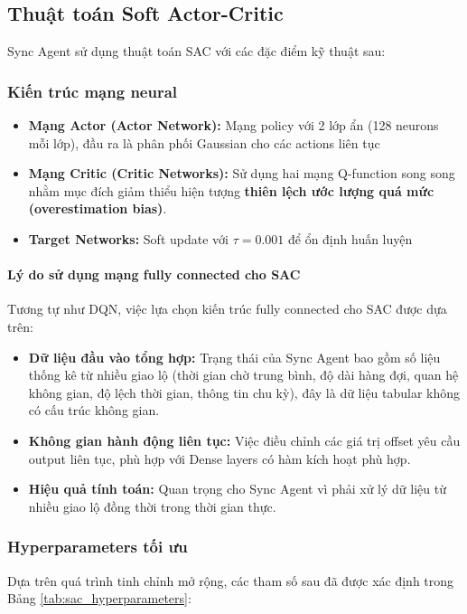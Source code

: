 \subsection{Thuật toán Soft Actor-Critic}
Sync Agent sử dụng thuật toán SAC với các đặc điểm kỹ thuật sau:

\subsubsection{Kiến trúc mạng neural}
\begin{itemize}
    \item \textbf{Mạng Actor (Actor Network):} Mạng policy với 2 lớp ẩn (128 neurons mỗi lớp),
        đầu ra là phân phối Gaussian cho các actions liên tục

    \item \textbf{Mạng Critic (Critic Networks):} Sử dụng hai mạng Q-function song song nhằm mục đích giảm thiểu hiện tượng \textbf{thiên lệch ước lượng quá mức (overestimation bias)}.

    \item \textbf{Target Networks:} Soft update với $\tau = 0.001$ để ổn định
        huấn luyện
\end{itemize}

\paragraph{Lý do sử dụng mạng fully connected cho SAC}
Tương tự như DQN, việc lựa chọn kiến trúc fully connected cho SAC được dựa trên:
\begin{itemize}
    \item \textbf{Dữ liệu đầu vào tổng hợp:} Trạng thái của Sync Agent bao gồm số liệu thống kê từ nhiều giao lộ (thời gian chờ trung bình, độ dài hàng đợi, quan hệ không gian, độ lệch thời gian, thông tin chu kỳ), đây là dữ liệu tabular không có cấu trúc không gian.
    \item \textbf{Không gian hành động liên tục:} Việc điều chỉnh các giá trị offset yêu cầu output liên tục, phù hợp với Dense layers có hàm kích hoạt phù hợp.
        \item \textbf{Hiệu quả tính toán:} Quan trọng cho Sync Agent vì phải xử lý dữ liệu từ nhiều giao lộ đồng thời trong thời gian thực.
    \end{itemize}

\subsubsection{Hyperparameters tối ưu}
Dựa trên quá trình tinh chỉnh mở rộng, các tham số sau đã được xác định trong Bảng \ref{tab:sac_hyperparameters}:

